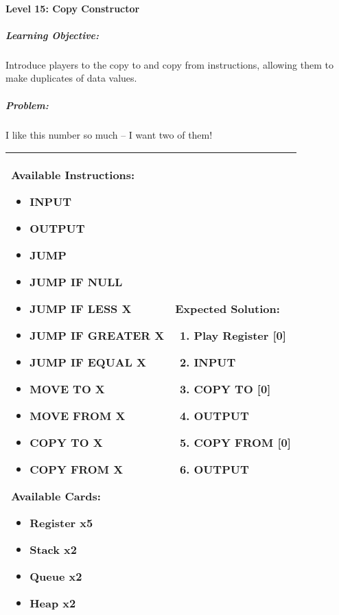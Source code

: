 \paragraph{Level 15: Copy Constructor}
\subparagraph{Learning Objective:} Introduce players to the copy to and copy from instructions, allowing them to make duplicates of data values.

\subparagraph{Problem:} I like this number so much -- I want two of them!

\begin{center}
    \begin{tabular}{ | m{6cm} | m{8cm} | } 
        \hline
            \textbf{Available Instructions:} 
            \begin{itemize}
                \setlength\itemsep{-.35em}
                \item INPUT
                \item OUTPUT
                \item JUMP
                \item JUMP IF NULL
                \item JUMP IF LESS X
                \item JUMP IF GREATER X
		\item JUMP IF EQUAL X
                \item MOVE TO X
                \item MOVE FROM X
                \item COPY TO X
                \item COPY FROM X
            \end{itemize}
            \textbf{Available Cards:} 
            \begin{itemize}
                \setlength\itemsep{-.35em}
                \item Register x5
		\item Stack x2
                \item Queue x2
                \item Heap x2
            \end{itemize}& 
            \textbf{Expected Solution:} 
            \begin{enumerate}
                \setlength\itemsep{-.35em}
		\item Play Register [0]
                \item INPUT
		\item COPY TO [0]
		\item OUTPUT
                \item COPY FROM [0]
		\item OUTPUT
            \end{enumerate}
            \\
        \hline
    \end{tabular}
\end{center}


